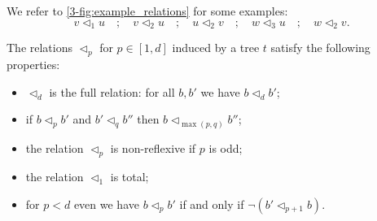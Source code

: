 We refer to \cref{3-fig:example_relations} for some examples:
\[
v \vartriangleleft_1 u \quad ; \quad  
v \vartriangleleft_2 u \quad ; \quad 
u \vartriangleleft_2 v \quad ; \quad 
w \vartriangleleft_3 u \quad ; \quad 
w \vartriangleleft_2 v.
\]

\begin{lemma}
\label{3-lem:properties_tree}
The relations $\vartriangleleft_p$ for $p \in [1,d]$ induced by a tree $t$ satisfy the following properties:
\begin{itemize}
	\item $\vartriangleleft_d$ is the full relation: for all $b,b'$ we have $b \vartriangleleft_d b'$;
	\item if $b \vartriangleleft_p b'$ and $b' \vartriangleleft_q b''$ then $b \vartriangleleft_{\max(p,q)} b''$;
	\item the relation $\vartriangleleft_p$ is non-reflexive if $p$ is odd;
	\item the relation $\vartriangleleft_1$ is total;
	\item for $p < d$ even we have $b \vartriangleleft_p b'$ if and only if $\neg (b' \vartriangleleft_{p+1} b)$.
\end{itemize}
\end{lemma}
%

